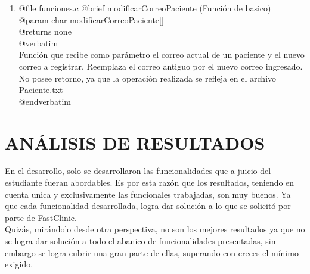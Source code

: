 \documentclass[12pt,letterpaper]{article}
\begin{document}
\begin{enumerate}
\item@file funciones.c\\
	@brief eliminarPaciente (Función de nivel medio)\\
    @param char runPaciente[]\\
    @returns none\\
    @verbatim \\
    	Función que recibe como parámetro el run de un paciente, realiza una búsqueda en "BD" y elimina los registros del paciente indicado, siempre y cuando, este paciente no tenga diagnósticos en los registros del sistema.
    	No posee retorno, ya que la operación se refleja en el archivo Paciente.txt.\\
    @endverbatim  

\item@file funciones.c\\
	@brief eliminarMedico (Función de nivel medio)\\
    @param char runDoctor[]\\
    @returns none\\
    @verbatim \\
    	Función que recibe como parámetro el run de un medico, realiza una busqueda en "BD" y elimina los registros del médico indicado, siempre y cuando, este médico no sea responsable de diagnósticos o tratamientos vigentes.
    	No posee retorno, ya que la operación se refleja en el archivo Doctor.txt\\
    @endverbatim   	
    
\item @file funciones.c
	@brief modificarCorreoPaciente (Función de basico)\\
    @param char modificarCorreoPaciente[]\\
    @returns none\\
    @verbatim \\
    	Función que recibe como parámetro el correo actual de un paciente y el nuevo correo a registrar.
    	Reemplaza el correo antiguo por el nuevo correo ingresado.
    	No posee retorno, ya que la operación realizada se refleja en el archivo Paciente.txt\\
    @endverbatim 
\end{enumerate}       

\section{ANÁLISIS DE RESULTADOS}
	En el desarrollo, solo se desarrollaron las funcionalidades que a juicio del estudiante fueran abordables. Es por esta razón que los resultados, teniendo en cuenta unica y exclusivamente las funcionales trabajadas, son muy buenos. Ya que cada funcionalidad desarrollada, logra dar solución a lo que se solicitó por parte de FastClinic. \\
	Quizás, mirándolo desde otra perspectiva, no son los mejores resultados ya que no se logra dar solución a todo el abanico de funcionalidades presentadas, sin embargo se logra cubrir una gran parte de ellas, superando con creces el mínimo exigido. 
\end{document}

